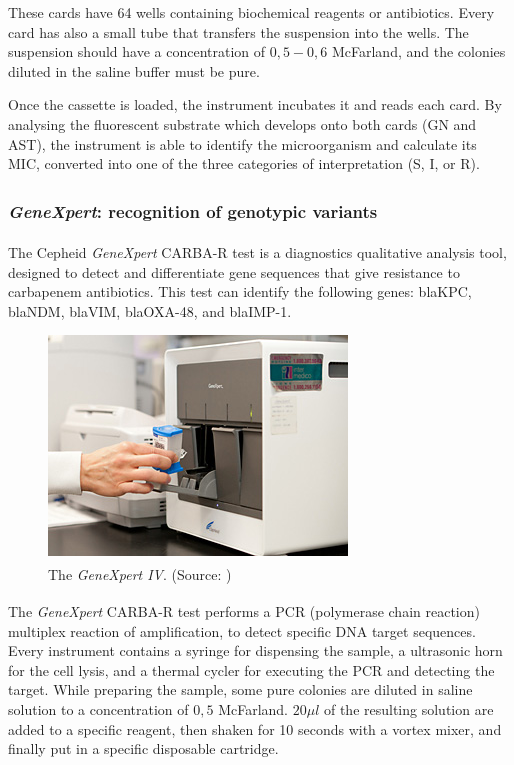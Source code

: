 \documentclass[11pt]{report}
\begin{document}
These cards have 64 wells containing biochemical reagents or antibiotics.
Every card has also a small tube that transfers the suspension into the wells.
The suspension should have a concentration of $0,5-0,6$ McFarland, and the colonies diluted in the saline buffer must be pure.

Once the cassette is loaded, the instrument incubates it and reads each card.
By analysing the fluorescent substrate which develops onto both cards (GN and AST), the instrument is able to identify the microorganism and calculate its MIC, converted into one of the three categories of interpretation (S, I, or R).

\subsubsection{\emph{GeneXpert}\textsuperscript{\textregistered}: recognition of genotypic variants}
The Cepheid \emph{GeneXpert}\textsuperscript{\textregistered} CARBA-R test is a diagnostics qualitative analysis tool, designed to detect and differentiate gene sequences that give resistance to carbapenem antibiotics.
This test can identify the following genes: blaKPC, blaNDM, blaVIM, blaOXA-48, and blaIMP-1.

\begin{figure}[htp]
\centering
\includegraphics[scale=1.00]{img/genexpert.jpg}
\caption{The \emph{GeneXpert\textsuperscript{\textregistered} IV}. (Source: \cite{genexpert})}
\label{GeneXpert}
\end{figure}

The \emph{GeneXpert}\textsuperscript{\textregistered} CARBA-R test performs a PCR (polymerase chain reaction) multiplex reaction of amplification, to detect specific DNA target sequences.
Every instrument contains a syringe for dispensing the sample, a ultrasonic horn for the cell lysis, and a thermal cycler for executing the PCR and detecting the target.
While preparing the sample, some pure colonies are diluted in saline solution to a concentration of $0,5$ McFarland.
$20\mu l$ of the resulting solution are added to a specific reagent, then shaken for 10 seconds with a vortex mixer, and finally put in a specific disposable cartridge.
\end{document}
